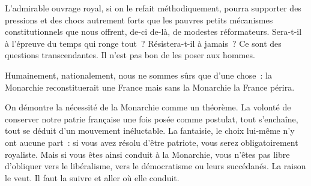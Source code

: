 \documentclass[french,twoside]{book} %
\newcommand{\astermono}{\medskip\centerline{\color{rubric}\large\selectfont{\syms ✻}}\medskip\par}%
\begin{document}
\astermono

\noindent L’admirable ouvrage royal, si on le refait méthodiquement, pourra supporter des pressions et des chocs autrement forts que les pauvres petits mécanismes constitutionnels que nous offrent, de-ci de-là, de modestes réformateurs. Sera-t-il à l’épreuve du temps qui ronge tout ? Résistera-t-il à jamais ? Ce sont des questions transcendantes. Il n’est pas bon de les poser aux hommes.\par
Humainement, nationalement, nous ne sommes sûrs que d’une chose : la Monarchie reconstituerait une France mais sans la Monarchie la France périra.\par

\astermono

\noindent On démontre la nécessité de la Monarchie comme un théorème. La volonté de conserver notre patrie française une fois posée comme postulat, tout s’enchaîne, tout se déduit d’un mouvement inéluctable. La fantaisie, le choix lui-même n’y ont aucune part : si vous avez résolu d’être patriote, vous serez obligatoirement royaliste. Mais si vous êtes ainsi conduit à la Monarchie, vous n’êtes pas libre d’obliquer vers le libéralisme, vers le démocratisme ou leurs succédanés. La raison le veut. Il faut la suivre et aller où elle conduit.\par

\astermono
\end{document}
